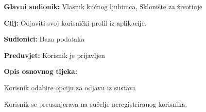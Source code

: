 					\pagebreak
                    \noindent {}
					\begin{packed_item}
						
						\item \textbf{Glavni sudionik: }Vlasnik kućnog ljubimca, Sklonište za životinje
						\item  \textbf{Cilj:} Odjaviti svoj korisnički profil iz aplikacije.
						\item  \textbf{Sudionici:} Baza podataka
						\item  \textbf{Preduvjet:} Korisnik je prijavljen
						\item  \textbf{Opis osnovnog tijeka:}
						
						\item[] \begin{packed_enum}
							
							\item Korisnik odabire opciju za odjavu iz sustava
							\item Korisnik se preusmjerava na sučelje neregistriranog korisnika.
						\end{packed_enum}
					\end{packed_item}
     
